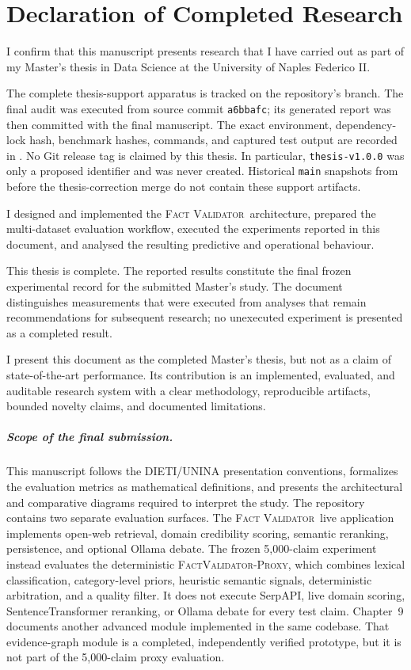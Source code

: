 \documentclass[12pt,a4paper,openany]{report}
\newcommand{\system}{\textsc{Fact Validator}}
\newcommand{\proxy}{\textsc{FactValidator-Proxy}}
\begin{document}
\chapter*{Declaration of Completed Research}
I confirm that this manuscript presents research that I have carried out as part of my Master's thesis in Data Science at the University of Naples Federico II.

The complete thesis-support apparatus is tracked on the repository's
 branch. The final audit was executed from source commit
\texttt{a6bbafc}; its generated report was then committed with the final
manuscript. The exact environment,
dependency-lock hash, benchmark hashes, commands, and captured test output are
recorded in
.
No Git release tag is claimed by this thesis. In particular,
\texttt{thesis-v1.0.0} was only a proposed identifier and was never created.
Historical \texttt{main} snapshots from before the thesis-correction merge do
not contain these support artifacts.

I designed and implemented the \system\ architecture, prepared the multi-dataset evaluation workflow, executed the experiments reported in this document, and analysed the resulting predictive and operational behaviour.

This thesis is complete. The reported results constitute the final frozen experimental record for the submitted Master's study. The document distinguishes measurements that were executed from analyses that remain recommendations for subsequent research; no unexecuted experiment is presented as a completed result.

I present this document as the completed Master's thesis, but not as a claim of state-of-the-art performance. Its contribution is an implemented, evaluated, and auditable research system with a clear methodology, reproducible artifacts, bounded novelty claims, and documented limitations.

\paragraph{Scope of the final submission.} This manuscript follows the DIETI/UNINA presentation conventions, formalizes the evaluation metrics as mathematical definitions, and presents the architectural and comparative diagrams required to interpret the study. The repository contains two separate evaluation surfaces. The \system\ live application implements open-web retrieval, domain credibility scoring, semantic reranking, persistence, and optional Ollama debate. The frozen 5{,}000-claim experiment instead evaluates the deterministic \proxy, which combines lexical classification, category-level priors, heuristic semantic signals, deterministic arbitration, and a quality filter. It does not execute SerpAPI, live domain scoring, SentenceTransformer reranking, or Ollama debate for every test claim. Chapter~9 documents another advanced module implemented in the same codebase. That evidence-graph module is a completed, independently verified prototype, but it is not part of the 5{,}000-claim proxy evaluation.
\end{document}
